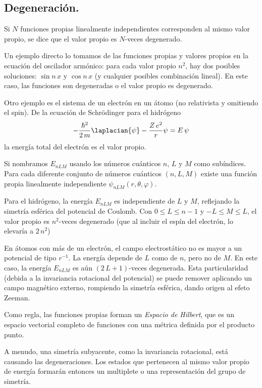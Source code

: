 \subsection{Degeneración.}
Si $N$ funciones propias linealmente independientes corresponden al mismo valor propio, se dice que el valor propio es $N$-veces degenerado.
\par
Un ejemplo directo lo tomamos de las funciones propias y valores propios en la ecuación del oscilador armónico: para cada valor propio $n^{2}$, hay dos posibles soluciones: $\sin n \, x$ y $\cos n \, x$ (y cualquier posibles combinación lineal). En este caso, las funciones son degeneradas o el valor propio es degenerado.
\par
Otro ejemplo es el sistema de un electrón en un átomo (no relativista y omitiendo el spin). De la ecuación de Schrödinger para el hidrógeno
\begin{align*}
- \dfrac{\hbar^{2}}{2 \, m} \laplacian{\psi} - \dfrac{Z \, e^{2}}{r} \psi =  E \, \psi
\end{align*}
la energía total del electrón es el valor propio.
\par
Si nombramos $E_{nLM}$ usando los números cuánticos $n$, $L$ y $M$ como subíndices. Para cada diferente conjunto de números cuánticos $(n, L, M)$ existe una función propia linealmente independiente $\psi_{nLM}(r,\theta, \varphi)$.
\par
Para el hidrógeno, la energía $E_{nLM}$ es independiente de $L$ y $M$, reflejando la simetría esférica del potencial de Coulomb. Con $0 \leq L \leq n-1$ y $-L \leq M \leq L$, el valor propio es $n^{2}$-veces degenerado (que al incluir el espín del electrón, lo elevaría a $2 \, n^{2}$)
\par
En átomos con más de un electrón, el campo electrostático no es mayor a un potencial de tipo $r^{-1}$. La energía depende de $L$ como de $n$, pero no de $M$. En este caso, la energía $E_{nLM}$ es aún $(2 \, L + 1)$-veces degenerada. Esta particularidad (debida a la invariancia rotacional del potencial) se puede remover aplicando un campo magnético externo, rompiendo la simetría esférica, dando origen al efeto Zeeman.
\par
Como regla, las funciones propias forman un \emph{Espacio de Hilbert}, que es un espacio vectorial completo de funciones con una métrica definida por el producto punto.
\par
A menudo, una simetría subyacente, como la invariancia rotacional, está causando las degeneraciones. Los estados que pertenecen al mismo valor propio de energía formarán entonces un multiplete o una representación del grupo de simetría.
